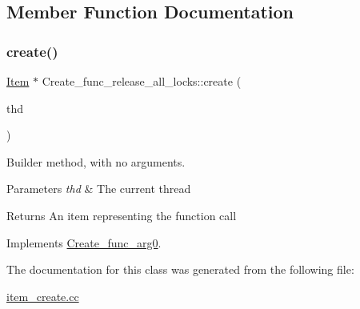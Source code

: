 \subsection{Member Function Documentation}
\mbox{\label{classCreate__func__release__all__locks_a2bbdf262c75f30639a451101c8e182a6}} 
\subsubsection{\texorpdfstring{create()}{create()}}
{\footnotesize\ttfamily \mbox{\hyperlink{classItem}{Item}} $\ast$ Create\+\_\+func\+\_\+release\+\_\+all\+\_\+locks\+::create (\begin{DoxyParamCaption}\item[{T\+HD $\ast$}]{thd }\end{DoxyParamCaption})\hspace{0.3cm}{\ttfamily [virtual]}}

Builder method, with no arguments. 
\begin{DoxyParams}{Parameters}
{\em thd} & The current thread \\
\hline
\end{DoxyParams}
\begin{DoxyReturn}{Returns}
An item representing the function call 
\end{DoxyReturn}


Implements \mbox{\hyperlink{classCreate__func__arg0_abb65b43817f9382759c79487228ee29f}{Create\+\_\+func\+\_\+arg0}}.



The documentation for this class was generated from the following file\+:\begin{DoxyCompactItemize}
\item 
\mbox{\hyperlink{item__create_8cc}{item\+\_\+create.\+cc}}\end{DoxyCompactItemize}
